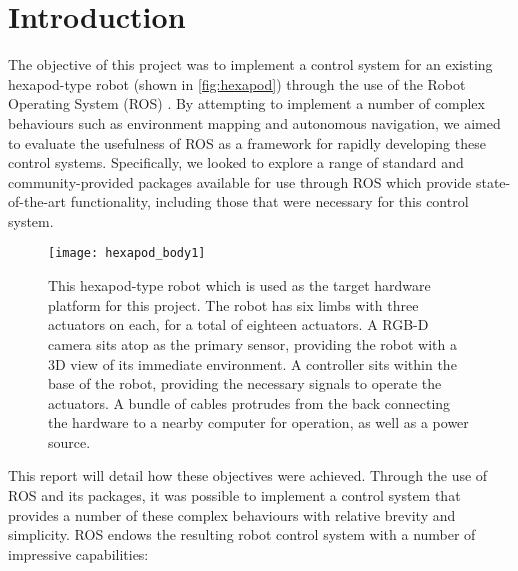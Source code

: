 \chapter{Introduction}
\label{chap:introduction}


The objective of this project was to implement a control system for an existing hexapod-type robot (shown in \autoref{fig:hexapod}) through the use of the Robot Operating System (ROS) \cite{ros_site}. By attempting to implement a number of complex behaviours such as environment mapping and autonomous navigation, we aimed to evaluate the usefulness of ROS as a framework for rapidly developing these control systems. Specifically, we looked to explore a range of standard and community-provided packages available for use through ROS which provide state-of-the-art functionality, including those that were necessary for this control system.

\begin{figure}[!h]
    \centering
    \texttt{[image: hexapod\_body1]}
    \caption{This hexapod-type robot which is used as the target hardware platform for this project. The robot has six limbs with three actuators on each, for a total of eighteen actuators. A RGB-D camera sits atop as the primary sensor, providing the robot with a 3D view of its immediate environment. A controller sits within the base of the robot, providing the necessary signals to operate the actuators. A bundle of cables protrudes from the back connecting the hardware to a nearby computer for operation, as well as a power source.}
    \label{fig:hexapod}
\end{figure}

This report will detail how these objectives were achieved. Through the use of ROS and its packages, it was possible to implement a control system that provides a number of these complex behaviours with relative brevity and simplicity. ROS endows the resulting robot control system with a number of impressive capabilities:

